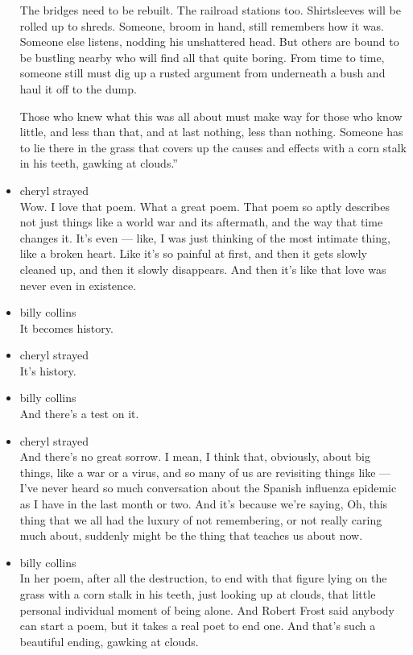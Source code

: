 \begin{itemize}
  The bridges need to be rebuilt. The railroad stations too.
  Shirtsleeves will be rolled up to shreds. Someone, broom in hand,
  still remembers how it was. Someone else listens, nodding his
  unshattered head. But others are bound to be bustling nearby who will
  find all that quite boring. From time to time, someone still must dig
  up a rusted argument from underneath a bush and haul it off to the
  dump.

  Those who knew what this was all about must make way for those who
  know little, and less than that, and at last nothing, less than
  nothing. Someone has to lie there in the grass that covers up the
  causes and effects with a corn stalk in his teeth, gawking at
  clouds.''
\item
  cheryl strayed\\
  Wow. I love that poem. What a great poem. That poem so aptly describes
  not just things like a world war and its aftermath, and the way that
  time changes it. It's even --- like, I was just thinking of the most
  intimate thing, like a broken heart. Like it's so painful at first,
  and then it gets slowly cleaned up, and then it slowly disappears. And
  then it's like that love was never even in existence.
\item
  billy collins\\
  It becomes history.
\item
  cheryl strayed\\
  It's history.
\item
  billy collins\\
  And there's a test on it.
\item
  cheryl strayed\\
  And there's no great sorrow. I mean, I think that, obviously, about
  big things, like a war or a virus, and so many of us are revisiting
  things like --- I've never heard so much conversation about the
  Spanish influenza epidemic as I have in the last month or two. And
  it's because we're saying, Oh, this thing that we all had the luxury
  of not remembering, or not really caring much about, suddenly might be
  the thing that teaches us about now.
\item
  billy collins\\
  In her poem, after all the destruction, to end with that figure lying
  on the grass with a corn stalk in his teeth, just looking up at
  clouds, that little personal individual moment of being alone. And
  Robert Frost said anybody can start a poem, but it takes a real poet
  to end one. And that's such a beautiful ending, gawking at clouds.

\end{itemize}
